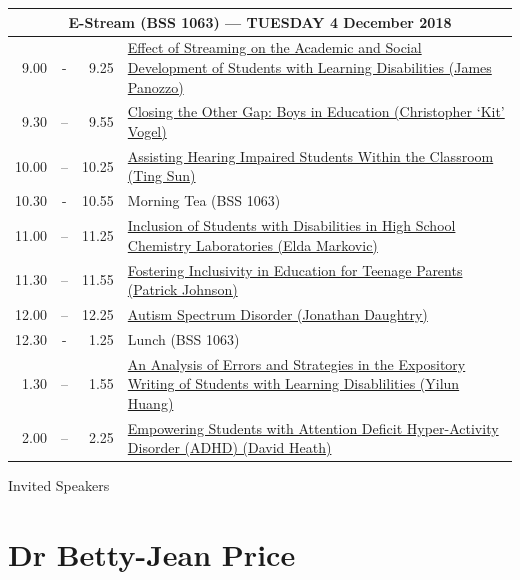 \documentclass[twoside,12pt,a4paper,notitlepage]{memoir}
\begin{document}
\begin{center}
\begin{tabular}{rcr|p{10.8cm}}
 \multicolumn{4}{c}{{\large E-Stream (BSS 1063) --- TUESDAY 4 December 2018}} \\ \hline
9.00 & - & 9.25 &
 \hyperref[aut:panozzo]{Effect of Streaming on the Academic and Social Development of Students with Learning Disabilities (James Panozzo)} \\ \hline
9.30 & – & 9.55 &
\hyperref[aut:vogel]{Closing the Other Gap: Boys in Education (Christopher `Kit' Vogel)} \\ \hline
10.00 & – & 10.25 &
\hyperref[aut:sun]{Assisting Hearing Impaired Students Within the Classroom (Ting Sun)} \\ \hline
10.30 & - & 10.55 & Morning Tea (BSS 1063) \\ \hline
11.00 & – & 11.25 & 
 \hyperref[aut:markovic]{Inclusion of Students with Disabilities in High School Chemistry Laboratories (Elda Markovic)} \\ \hline
11.30 & – & 11.55 &
 \hyperref[aut:johnson]{Fostering Inclusivity in Education for Teenage Parents (Patrick Johnson)} \\ \hline
12.00 & – & 12.25 &
 \hyperref[aut:daughtry]{Autism Spectrum Disorder (Jonathan Daughtry)} \\ \hline
12.30 & - & 1.25 & Lunch (BSS 1063) \\ \hline
1.30 & – & 1.55 &
 \hyperref[aut:huang]{An Analysis of Errors and Strategies in the Expository Writing of Students with Learning Disablilities (Yilun Huang)} \\ \hline
2.00 & – & 2.25 & 
 \hyperref[aut:heath]{Empowering Students with Attention Deficit Hyper-Activity Disorder (ADHD) (David Heath)} \\ \hline
\end{tabular}
\end{center}




\clearpage{}



\clearpage{}
\vspace*{2cm}
{\Huge Invited Speakers}
\vspace{2cm}

\section*{Dr Betty-Jean Price}
\end{document}
